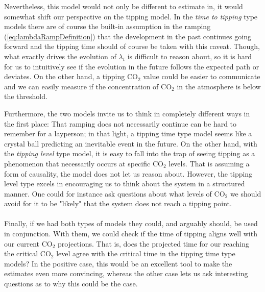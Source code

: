 Nevertheless, this model would not only be different to estimate in, it would somewhat shift our perspective on the tipping model. In the \textit{time to tipping} type models there are of course the built-in assumption in the ramping (\ref{eq:lambdaRampDefinition}) that the development in the past continues going forward and the tipping time should of course be taken with this caveat. Though, what exactly drives the evolution of $\lambda_t$ is difficult to reason about, so it is hard for us to intuitively see if the evolution in the future follows the expected path or deviates. On the other hand, a tipping $\mathrm{CO}_2$ value could be easier to communicate and we can easily measure if the concentration of $\mathrm{CO}_2$ in the atmosphere is below the threshold. 

Furthermore, the two models invite us to think in completely different ways in the first place: That ramping does not necessarily continue can be hard to remember for a layperson; in that light, a tipping time type model seems like a crystal ball predicting an inevitable event in the future. On the other hand, with the \textit{tipping level} type model, it is easy to fall into the trap of seeing tipping as a phenomenon that necessarily occurs at specific $\mathrm{CO}_2$ levels. That is assuming a form of causality, the model does not let us reason about. However, the tipping level type excels in encouraging us to think about the system in a structured manner. One could for instance ask questions about what levels of $\mathrm{CO}_2$ we should avoid for it to be "likely" that the system does not reach a tipping point. \\\\
Finally, if we had both types of models they could, and arguably should, be used in conjunction. With them, we could check if the time of tipping aligns well with our current $\mathrm{CO}_2$ projections. That is, does the projected time for our reaching the critical $\mathrm{CO}_2$ level agree with the critical time in the tipping time type models? In the positive case, this would be an excellent tool to make the estimates even more convincing, whereas the other case lets us ask interesting questions as to why this could be the case.

